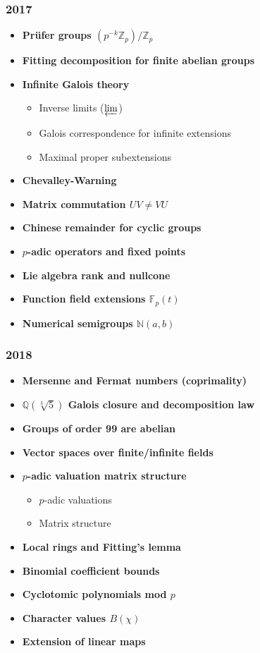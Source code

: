 \subsubsection*{2017}
\begin{itemize}
    \item \textbf{Pr\"ufer groups $(p^{-k}\mathbb{Z}_p)/\mathbb{Z}_p$}
    \item \textbf{Fitting decomposition for finite abelian groups}
    \item \textbf{Infinite Galois theory}
        \begin{itemize}
            \item Inverse limits ($\varprojlim$)
            \item Galois correspondence for infinite extensions
            \item Maximal proper subextensions
        \end{itemize}
    \item \textbf{Chevalley-Warning}
    \item \textbf{Matrix commutation $UV \neq VU$}
    \item \textbf{Chinese remainder for cyclic groups}
    \item \textbf{$p$-adic operators and fixed points}
    \item \textbf{Lie algebra rank and nullcone}
    \item \textbf{Function field extensions $\mathbb{F}_p(t)$}
    \item \textbf{Numerical semigroups $\mathbb{N}(a,b)$}
\end{itemize}

\subsubsection*{2018}
\begin{itemize}
    \item \textbf{Mersenne and Fermat numbers (coprimality)}
    \item \textbf{$\mathbb{Q}(\sqrt[3]{5})$ Galois closure and decomposition law}
    \item \textbf{Groups of order 99 are abelian}
    \item \textbf{Vector spaces over finite/infinite fields}
    \item \textbf{$p$-adic valuation matrix structure}
        \begin{itemize}
            \item $p$-adic valuations
            \item Matrix structure
        \end{itemize}
    \item \textbf{Local rings and Fitting's lemma}
    \item \textbf{Binomial coefficient bounds}
    \item \textbf{Cyclotomic polynomials mod $p$}
    \item \textbf{Character values $B(\chi)$}
    \item \textbf{Extension of linear maps}
\end{itemize}

